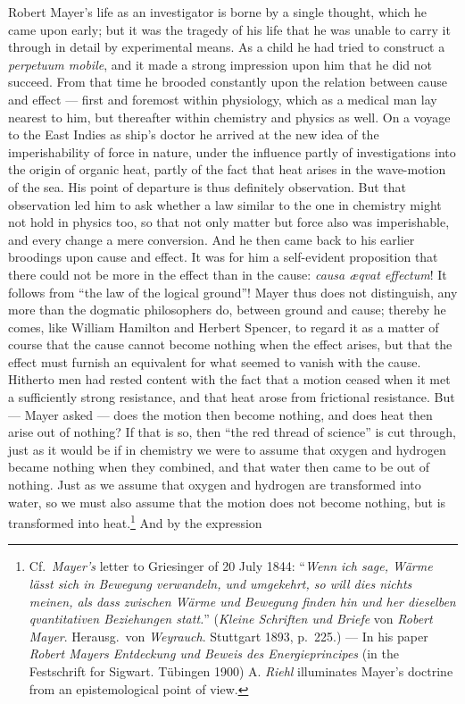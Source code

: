 \documentclass[12pt,a4paper]{book}
\newcommand{\opage}[1]{\marginnote{\footnotesize\textit{[#1]}}}
\begin{document}
\opage{497}Robert Mayer's life as an investigator is borne by a single thought, which he
came upon early; but it was the tragedy of his life that he was unable to carry
it through in detail by experimental means. As a child he had tried to construct
a \textit{perpetuum mobile}, and it made a strong impression upon him that he
did not succeed. From that time he brooded constantly upon the relation between
cause and effect --- first and foremost within physiology, which as a medical
man lay nearest to him, but thereafter within chemistry and physics as well. On
a voyage to the East Indies as ship's doctor he arrived at the new idea of the
imperishability of force in nature, under the influence partly of investigations
into the origin of organic heat, partly of the fact that heat arises in the
wave-motion of the sea. His point of departure is thus definitely observation.
But that observation led him to ask whether a law similar to the one in
chemistry might not hold in physics too, so that not only matter but force also
was imperishable, and every change a mere conversion. And he then came back to
his earlier broodings upon cause and effect. It was for him a self-evident
proposition that there could not be more in the effect than in the cause:
\textit{causa æqvat effectum}! It follows from ``the law of the logical
ground''! Mayer thus does not distinguish, any more than the dogmatic
philosophers do, between ground and cause; thereby he comes, like William
Hamilton and Herbert Spencer, to regard it as a matter of course that the cause
cannot become nothing when the effect arises, but that the effect must furnish
an equivalent for what seemed to vanish with the cause. Hitherto men had rested
content with the fact that a motion ceased when it met a sufficiently strong
resistance, and that heat arose from frictional resistance. But --- Mayer asked
--- does the motion then become nothing, and does heat then arise out of
nothing? If that is so, then ``the red thread of science'' is cut through, just
as it would be if in chemistry we were to assume that oxygen and hydrogen became
nothing when they combined, and that water then came to be out of nothing. Just
as we assume that oxygen and hydrogen are transformed into water, so we must
also assume that the motion does not become nothing, but is transformed into
heat.\footnote{Cf.\ \emph{Mayer's} letter to Griesinger of 20 July 1844:
``\textit{Wenn ich sage, Wärme lässt sich in Bewegung verwandeln, und umgekehrt,
so will dies nichts meinen, als dass zwischen Wärme und Bewegung finden hin und
her dieselben qvantitativen Beziehungen statt.}'' (\textit{Kleine Schriften und
Briefe} von \emph{Robert Mayer}. Herausg.\ von \emph{Weyrauch}. Stuttgart 1893, p.~225.) ---
In his paper \textit{Robert Mayers Entdeckung und Beweis des Energieprincipes}
(in the Festschrift for Sigwart. Tübingen 1900) A. \emph{Riehl} illuminates Mayer's
doctrine from an epistemological point of view.} And by the expression
\end{document}
